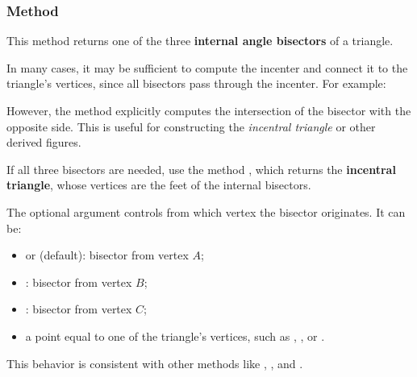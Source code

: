 \subsubsection{Method } %
\label{ssub:method_triangle_bisector}

This method returns one of the three \textbf{internal angle bisectors} of a triangle.

\medskip
\noindent
In many cases, it may be sufficient to compute the incenter and connect it to the triangle’s vertices, since all bisectors pass through the incenter. For example:
\begin{mybox}
\end{mybox}

\noindent
However, the method  explicitly computes the intersection of the bisector with the opposite side. This is useful for constructing the \emph{incentral triangle} or other derived figures.

\medskip
\noindent
If all three bisectors are needed, use the method , which returns the \textbf{incentral triangle}, whose vertices are the feet of the internal bisectors.

\medskip
\noindent
The optional argument  controls from which vertex the bisector originates. It can be:
\begin{itemize}
  \item {} or  (default): bisector from vertex $A$;
  \item {}: bisector from vertex $B$;
  \item {}: bisector from vertex $C$;
  \item a point equal to one of the triangle’s vertices, such as , , or .
\end{itemize}

\noindent
This behavior is consistent with other methods like , , and .

